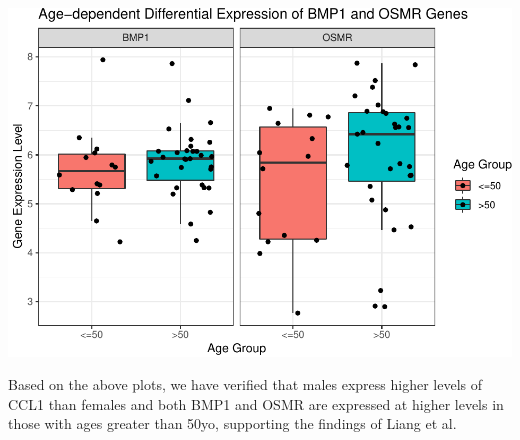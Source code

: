 \documentclass[
]{article}
\begin{document}
\includegraphics{LiuKevin_Final_Project_files/figure-latex/unnamed-chunk-17-2.pdf}

Based on the above plots, we have verified that males express higher
levels of CCL1 than females and both BMP1 and OSMR are expressed at
higher levels in those with ages greater than 50yo, supporting the
findings of Liang et al.
\end{document}
